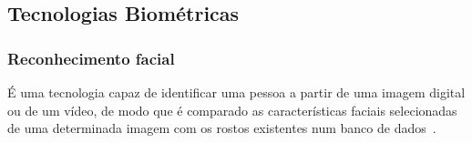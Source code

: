 \subsection{Tecnologias Biométricas}\label{subsec:biometria-tecnologias}

\subsubsection{Reconhecimento facial}\label{subsec:reconhecimento-facial}
É uma tecnologia capaz de identificar uma pessoa a partir de uma imagem digital ou de um vídeo, de modo que é comparado as características faciais selecionadas de uma determinada imagem com os rostos existentes num banco de dados~\cite{orvalho2019reconhecimento}.



